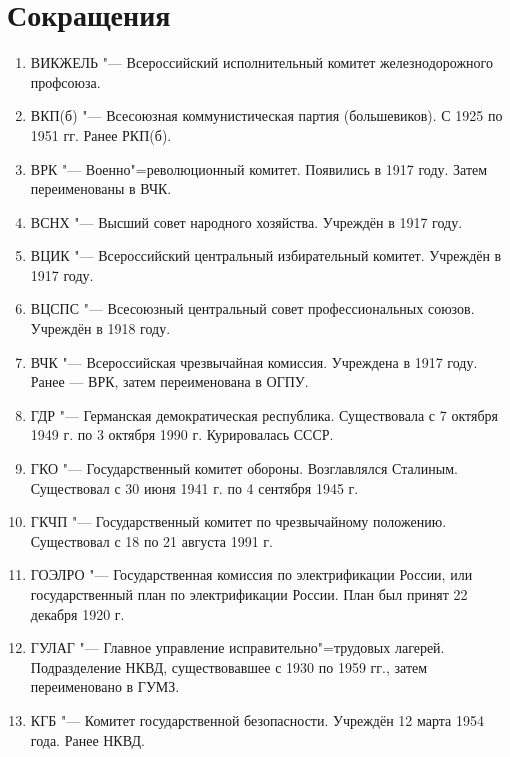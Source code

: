 \section{Сокращения}
\begin{enumerate}
    \item ВИКЖЕЛЬ "--- Всероссийский исполнительный комитет железнодорожного профсоюза. \\
    \item ВКП(б) "--- Всесоюзная коммунистическая партия (большевиков). С 1925 по 1951 гг. Ранее РКП(б). \\
    \item ВРК "--- Военно"=революционный комитет. Появились в 1917 году. Затем переименованы в ВЧК. \\
    \item ВСНХ "--- Высший совет народного хозяйства. Учреждён в 1917 году. \\
    \item ВЦИК "--- Всероссийский центральный избирательный комитет. Учреждён в 1917 году. \\
    \item ВЦСПС "--- Всесоюзный центральный совет профессиональных союзов. Учреждён в 1918 году. \\
    \item ВЧК "--- Всероссийская чрезвычайная комиссия. Учреждена в 1917 году. Ранее --- ВРК, затем переименована в ОГПУ. \\
    \item ГДР "--- Германская демократическая республика. Существовала с 7 октября 1949 г. по 3 октября 1990 г. Курировалась СССР. \\
    \item ГКО "--- Государственный комитет обороны. Возглавлялся Сталиным. Существовал с 30 июня 1941 г. по 4 сентября 1945 г. \\
    \item ГКЧП "--- Государственный комитет по чрезвычайному положению. Существовал с 18 по 21 августа 1991 г. \\
    \item ГОЭЛРО "--- Государственная комиссия по электрификации России, или государственный план по электрификации России. План был принят 22 декабря 1920 г.  \\
    \item ГУЛАГ "--- Главное управление исправительно"=трудовых лагерей. Подразделение НКВД, существовавшее с 1930 по 1959 гг., затем переименовано в ГУМЗ. \\
    \item КГБ "--- Комитет государственной безопасности. Учреждён 12 марта 1954 года. Ранее НКВД. \\

\end{enumerate}
